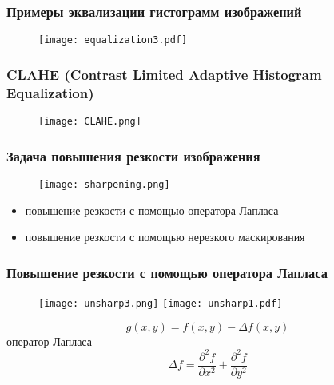 \documentclass[
    12pt, 
    usepdftitle=false,
    aspectratio=1610
]{beamer}
\begin{document}
\begin{frame}
    \frametitle{Примеры эквализации гистограмм изображений}
    \begin{figure}[t]
        \texttt{[image: equalization3.pdf]}
    \end{figure}
\end{frame}

\begin{frame}
\frametitle{CLAHE (Contrast Limited Adaptive Histogram Equalization)}
\begin{figure}[t]
    \texttt{[image: CLAHE.png]}
\end{figure}
\end{frame}

\begin{frame}
\frametitle{Задача повышения резкости изображения}
\begin{figure}[t]
    \texttt{[image: sharpening.png]}
\end{figure}
\begin{itemize}
    \item повышение резкости с помощью оператора Лапласа
    \item повышение резкости с помощью нерезкого маскирования
\end{itemize}
\end{frame}

\begin{frame}
\frametitle{Повышение резкости с помощью оператора Лапласа}
\begin{figure}[t]
    \texttt{[image: unsharp3.png]}
    \hspace{1cm}
    \texttt{[image: unsharp1.pdf]}
\end{figure}
$$
    g(x,y)=f(x,y)-\Delta f(x,y)
$$
оператор Лапласа
$$
    \Delta f=\frac{\partial^2 f}{\partial x^2}+\frac{\partial^2 f}{\partial y^2}
$$
\end{frame}
\end{document}
